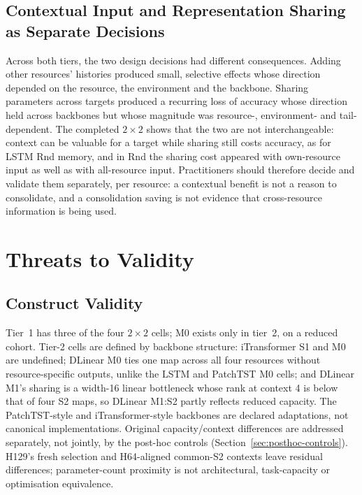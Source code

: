 \documentclass[a4paper,fleqn]{cas-dc}
\begin{document}
\subsection{Contextual Input and Representation Sharing as Separate Decisions}
\label{sec:discussion-separability}

Across both tiers, the two design decisions had different consequences.
Adding other resources' histories produced small, selective effects whose
direction depended on the resource, the environment and the backbone.
Sharing parameters across targets produced a recurring loss of accuracy
whose direction held across backbones but whose magnitude was resource-,
environment- and tail-dependent. The completed $2\times2$ shows that the two
are not interchangeable: context can be valuable for a target while sharing
still costs accuracy, as for LSTM Rnd memory, and in Rnd the sharing cost
appeared with own-resource input as well as with all-resource input. Practitioners should therefore decide
and validate them separately, per resource: a contextual benefit is not a
reason to consolidate, and a consolidation saving is not evidence that
cross-resource information is being used.

\section{Threats to Validity}
\label{sec:threats}

\subsection{Construct Validity}
\label{sec:threats-construct}

Tier~1 has three of the four $2\times2$ cells; M0 exists only in tier~2,
on a reduced cohort. Tier-2 cells are defined by backbone structure:
iTransformer S1 and M0 are undefined; DLinear M0 ties one map across all
four resources without resource-specific outputs, unlike the LSTM and
PatchTST M0 cells; and DLinear M1's sharing is a width-16 linear bottleneck
whose rank at context 4 is below that of four S2 maps, so DLinear M1:S2 partly
reflects reduced capacity. The PatchTST-style and iTransformer-style
backbones are declared adaptations, not canonical implementations. Original
capacity/context differences are addressed separately, not jointly, by the
post-hoc controls (Section~\ref{sec:posthoc-controls}). H129's fresh selection
and H64-aligned common-S2 contexts leave residual differences; parameter-count
proximity is not architectural, task-capacity or optimisation equivalence.
\end{document}
